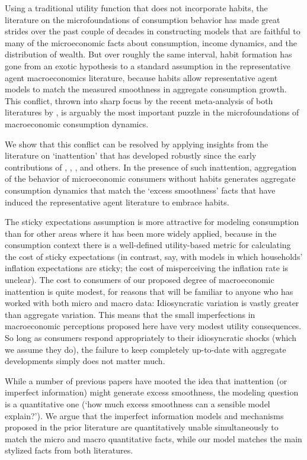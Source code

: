 \documentclass[titlepage]{\econtex}\newcommand{\texname}{cAndCwithStickyE}
\begin{document}
Using a traditional utility function that does not incorporate habits, the literature on the microfoundations of consumption behavior has made great strides over the past couple of decades in constructing models that are faithful to many of the microeconomic facts about consumption, income dynamics, and the distribution of wealth.  But over roughly the same interval, habit formation has gone from an exotic hypothesis to a standard assumption in the representative agent macroeconomics literature, because habits allow representative agent models to match the measured smoothness in aggregate consumption growth.  This conflict, thrown into sharp focus by the recent meta-analysis of both literatures by \cite{hrsHabit}, is arguably the most important puzzle in the microfoundations of macroeconomic consumption dynamics.

We show that this conflict can be resolved by applying insights from the literature on `inattention' that has developed robustly since the early contributions of \cite{simsInattention}, \cite{woodfordImperfect}, \cite{mrSlumps}, and others.  In the presence of such inattention, aggregation of the behavior of microeconomic consumers without habits generates aggregate consumption dynamics that match the `excess smoothness' facts that have induced the representative agent literature to embrace habits.

The sticky expectations assumption is more attractive for modeling consumption than for other areas where it has been more widely applied, because in the consumption context there is a well-defined utility-based metric for calculating the cost of sticky expectations (in contrast, say, with models in which households' inflation expectations are sticky; the cost of misperceiving the inflation rate is unclear).  The cost to consumers of our proposed degree of macroeconomic inattention is quite modest, for reasons that will be familiar to anyone who has worked with both micro and macro data: Idiosyncratic variation is vastly greater than aggregate variation.  This means that the small imperfections in macroeconomic perceptions proposed here have very modest utility consequences.  So long as consumers respond appropriately to their idiosyncratic shocks (which we assume they do), the failure to keep completely up-to-date with aggregate developments simply does not matter much.

While a number of previous papers have mooted the idea that inattention (or imperfect information) might generate excess smoothness, the modeling question is a quantitative one (`how much excess smoothness can a sensible model explain?').  We argue that the imperfect information models and mechanisms proposed in the prior literature are quantitatively unable simultaneously to match the micro and macro quantitative facts, while our model matches the main stylized facts from both literatures.
\end{document}
